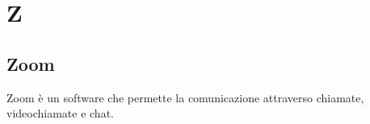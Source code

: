 \section{Z}

\subsection{Zoom}%
Zoom è un software che permette la comunicazione attraverso chiamate, videochiamate e chat. 
\clearpage